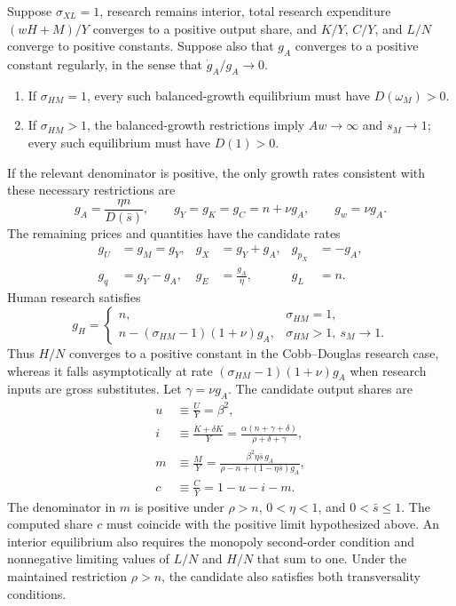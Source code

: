 \begin{proposition}
\label{prop:axm-cd-bgp}
Suppose \(\sigma_{XL}=1\), research remains interior, total research expenditure
\((wH+M)/Y\) converges to a positive output share, and \(K/Y\), \(C/Y\), and
\(L/N\) converge to positive constants. Suppose also that \(g_A\) converges to a
positive constant regularly, in the sense that \(\dot g_A/g_A\to0\).

\begin{enumerate}[label=(\roman*)]
\item If \(\sigma_{HM}=1\), every such balanced-growth equilibrium must have
 \(D(\omega_M)>0\).
\item If \(\sigma_{HM}>1\), the balanced-growth restrictions imply
 \(Aw\to\infty\) and \(s_M\to1\); every such equilibrium must have \(D(1)>0\).
\end{enumerate}

If the relevant denominator is positive, the only growth rates consistent with
these necessary restrictions are
\begin{equation}
 g_A=\frac{\eta n}{D(\bar s)},\qquad
 g_Y=g_K=g_C=n+\nu g_A,\qquad
 g_w=\nu g_A.
 \label{eq:axm-cd-growth-rates}
\end{equation}
The remaining prices and quantities have the candidate rates
\begin{align}
 g_U&=g_M=g_Y,&
 g_X&=g_Y+g_A,&
 g_{p_X}&=-g_A,\\
 g_q&=g_Y-g_A,&
 g_E&=\frac{g_A}{\eta},&
 g_L&=n.
 \label{eq:axm-cd-remaining-rates}
\end{align}
Human research satisfies
\begin{equation}
 g_H=
 \begin{cases}
 n,&\sigma_{HM}=1,\\
 n-(\sigma_{HM}-1)(1+\nu)g_A,
 &\sigma_{HM}>1,\ s_M\to1.
 \end{cases}
 \label{eq:axm-human-research-growth}
\end{equation}
Thus \(H/N\) converges to a positive constant in the Cobb--Douglas research
case, whereas it falls asymptotically at rate
\((\sigma_{HM}-1)(1+\nu)g_A\) when research inputs are gross substitutes.
Let \(\gamma=\nu g_A\). The candidate output shares are
\begin{align}
 u&\equiv\frac{U}{Y}=\beta^2,\\
 i&\equiv\frac{\dot K+\delta K}{Y}
 =\frac{\alpha(n+\gamma+\delta)}{\rho+\delta+\gamma},\\
 m&\equiv\frac{M}{Y}
 =\frac{\beta^2\eta\bar s\,g_A}
 {\rho-n+(1-\eta\bar s)g_A},\\
 c&\equiv\frac{C}{Y}=1-u-i-m.
 \label{eq:axm-cd-shares}
\end{align}
The denominator in \(m\) is positive under \(\rho>n\), \(0<\eta<1\), and
\(0<\bar s\leq1\).
The computed share \(c\) must coincide with the positive limit hypothesized above.
An interior equilibrium also requires the monopoly second-order condition and
nonnegative limiting values of \(L/N\) and \(H/N\) that sum to one. Under the
maintained restriction \(\rho>n\), the candidate also satisfies both
transversality conditions.
\end{proposition}

